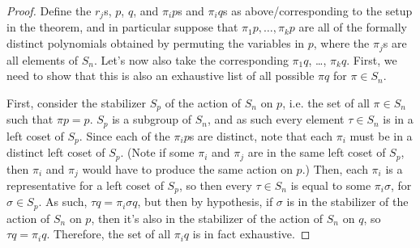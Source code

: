 \documentclass[12pt]{scrartcl}
\begin{document}
\begin{proof}
Define the $r_j$s, $p$, $q$, and $\pi_i p$s and $\pi_i q$s as above/corresponding to the setup in the theorem, and in particular suppose that $\pi_1 p, \dots, \pi_k p$ are all of the formally distinct polynomials obtained by permuting the variables in $p$, where the $\pi_j$s are all elements of $S_n$. Let's now also take the corresponding $\pi_1 q$, \dots, $\pi_k q$. First, we need to show that this is also an exhaustive list of all possible $\pi q$ for $\pi \in S_n$. 

First, consider the stabilizer $S_p$ of the action of $S_n$ on $p$, i.e. the set of all $\pi \in S_n$ such that $\pi p = p$. $S_p$ is a subgroup of $S_n$, and as such every element $\tau \in S_n$ is in a left coset of $S_p$. Since each of the $\pi_i p$s are distinct, note that each $\pi_i$ must be in a distinct left coset of $S_p$. (Note if some $\pi_i$ and $\pi_j$ are in the same left coset of $S_p$, then $\pi_i$ and $\pi_j$ would have to produce the same action on $p$.) Then, each $\pi_i$ is a representative for a left coset of $S_p$, so then every $\tau \in S_n$ is equal to some $\pi_i \sigma$, for $\sigma \in S_p$. As such, $\tau q = \pi_i \sigma q$, but then by hypothesis, if $\sigma$ is in the stabilizer of the action of $S_n$ on $p$, then it's also in the stabilizer of the action of $S_n$ on $q$, so $\tau q = \pi_i q$. Therefore, the set of all $\pi_i q$ is in fact exhaustive. 


\end{proof}
\end{document}
